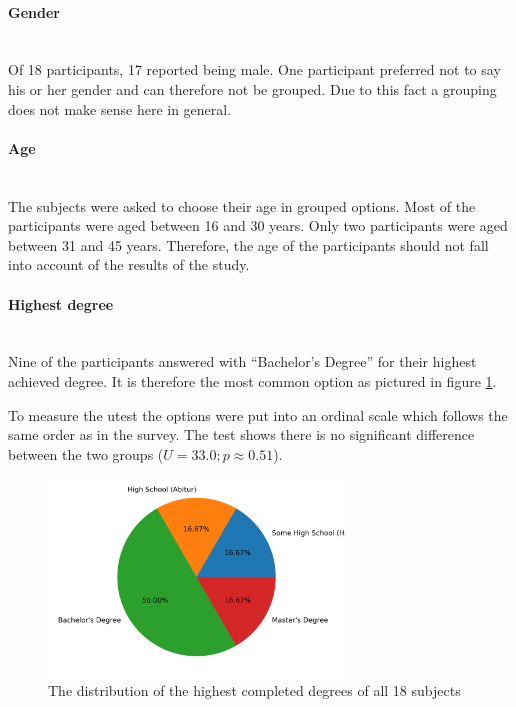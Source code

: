 \paragraph{Gender}\mbox{}\\
Of 18 participants, 17 reported being male. 
One participant preferred not to say his or her gender and can therefore not be grouped.
Due to this fact a grouping does not make sense here in general. 

\paragraph{Age}\mbox{}\\
The subjects were asked to choose their age in grouped options. 
Most of the participants were aged between 16 and 30 years.
Only two participants were aged between 31 and 45 years. 
Therefore, the age of the participants should not fall into account of the results of the study.

\paragraph{Highest degree}\mbox{}\\
Nine of the participants answered with \enquote{Bachelor's Degree} for their highest achieved degree. 
It is therefore the most common option as pictured in figure \ref{fig:degree}.

To measure the \gls{utest} the options were put into an ordinal scale which follows the same order as in the survey.
The test shows there is no significant difference between the two groups ($U = 33.0; p \approx 0.51$).

\begin{figure}[H]
  \centering
  \includegraphics[width=0.7\textwidth]{Evaluation/img/degree.png}
  \caption{The distribution of the highest completed degrees of all 18 subjects}\label{fig:degree}
\end{figure}

